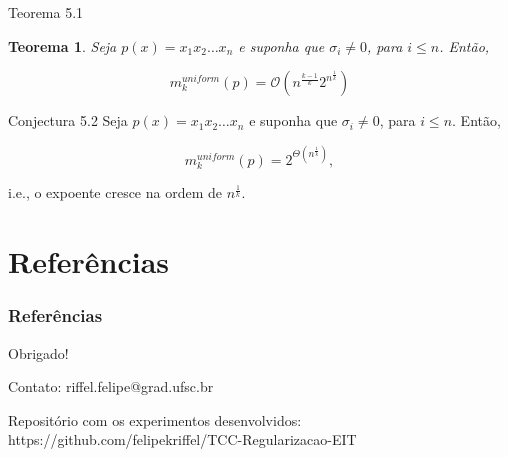 \documentclass{beamer}
\newtheorem{teo}{Teorema}[section]
\theoremstyle{definition}
\begin{document}
\begin{frame}{Teorema 5.1}
    \begin{teo}
        Seja $p(x) = x_1x_2 \dots x_n$ e suponha que $\sigma_i \neq 0$, para $i \leq n$. Então, 

        \begin{equation*}
            m_k^{uniform}(p) = \mathcal O(n^{\frac{k-1}{k}} 2^{n^{\frac 1 k}})
        \end{equation*}
    \end{teo}
\end{frame}

\begin{frame}{Conjectura 5.2}
    Seja $p(x) = x_1x_2 \dots x_n$ e suponha que $\sigma_i \neq 0$, para $i \leq n$. Então, 

        \begin{equation*}
            m_k^{uniform}(p) = 2^{\Theta (n^{\frac 1 k})},
        \end{equation*}
    
    i.e., o expoente cresce na ordem de $n^{\frac 1 k}$.
\end{frame}

\section{Referências}
\begin{frame}
\tableofcontents[currentsection]
\end{frame}

\begin{frame}
\frametitle{Referências}
\vspace{-2em}
\scriptsize

    
\end{frame}

\begin{frame}

\begin{center}
\Large Obrigado!
\end{center}

\vspace{1em}
Contato: riffel.felipe@grad.ufsc.br 

Repositório com os experimentos desenvolvidos: https://github.com/felipekriffel/TCC-Regularizacao-EIT
    
\end{frame}
\end{document}
